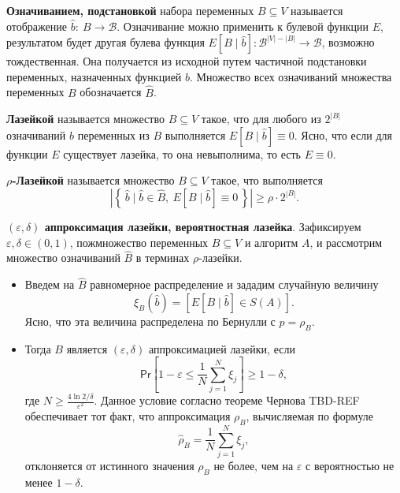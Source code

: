 \begin{definition}
    \textbf{Означиванием, подстановкой} набора переменных $B \subseteq V$ называется отображение
    $\hat{b}\colon~ B \to \mathcal{B}$. Означивание можно применить к булевой функции $E$,
    результатом будет другая булева функция $E[B \mid \hat{b}] \colon \mathcal{B}^{|V| - |B|} \to
    \mathcal{B}$, возможно тождественная. Она получается из исходной путем частичной подстановки
    переменных, назначенных функцией $\hat{b}$. Множество всех означиваний множества переменных
    $B$ обозначается $\hat{B}$.
\end{definition}

\begin{definition}
    \textbf{Лазейкой} называется множество $B \subseteq V$ такое, что для любого из $2^{|B|}$
    означиваний $\hat{b}$ переменных из $B$ выполняется $E[B \mid \hat{b}] \equiv 0$.
    Ясно, что если для функции $E$ существует лазейка, то она невыполнима, то есть $E \equiv 0$.
\end{definition}


\begin{definition}\label{overview:rho-backdoor}
    \textbf{$\rho$-Лазейкой} называется множество $B \subseteq V$ такое, что выполняется
\[
    \left|\left\{\, \hat{b} \mid \hat{b} \in \hat{B},~ E[B \mid \hat{b}] \equiv 0 \,\right\}\right|
    \geqslant \rho \cdot 2^{|B|}.
\]
\end{definition}

\newcommand*{\prob}{\mathsf{Pr}}

\begin{definition}\label{overview:prob-backdoor}
    \textbf{$(\varepsilon, \delta)$ аппроксимация лазейки, вероятностная лазейка}. Зафиксируем
    $\varepsilon, \delta \in (0, 1)$, пожмножество переменных $B \subseteq V$ и алгоритм $A$, 
    и рассмотрим множество означиваний $\hat{B}$ в терминах $\rho$-лазейки.
    \begin{itemize}
        \item Введем на $\hat{B}$ равномерное распределение и зададим случайную величину
            \[
                \xi_B(\hat{b}) = \left[E[B \mid \hat{b}] \in S(A)\right].
            \]
            Ясно, что эта величина распределена по Бернулли с $p = \rho_B$.
        \item Тогда $B$ является $(\varepsilon, \delta)$ аппроксимацией лазейки, если
            \[
                \prob{\left[1 - \varepsilon \leqslant \frac{1}{N}\sum_{j=1}^{N}{\xi_j}\right]}
                \geqslant 1 - \delta,
            \]
            где $N \geqslant \frac{4 \ln{2/\delta}}{\varepsilon^2}$. Данное условие согласно
            теореме Чернова TBD-REF обеспечивает тот факт, что аппроксимация $\rho_B$, 
            вычисляемая по формуле 
            \begin{equation}
                \hat{\rho}_B = \frac{1}{N} \sum_{j=1}^{N}{\xi_j}\label{overview:rho-hat},
            \end{equation}
            отклоняется от истинного значения $\rho_B$ не более, чем на $\varepsilon$ с вероятностью 
            не менее $1 - \delta$.
    \end{itemize}
\end{definition}

